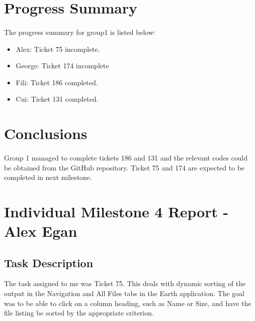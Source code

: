 \documentclass[10pt,a4,oneside]{article}
\begin{document}
\section{Progress Summary}

\paragraph{}
The progress summary for group1 is listed below:

\begin{itemize}
 \item Alex: Ticket 75 incomplete.
 \item George: Ticket 174 incomplete
 \item Fili: Ticket 186 completed.
 \item Cui: Ticket 131 completed.
\end{itemize}

\newpage

\section{Conclusions}

\paragraph{}
\noindent Group 1 managed to complete tickets 186 and 131 and the relevant codes could be obtained from the GitHub repository. Ticket 75 and 174 are expected to be completed in next milestone.

\newpage

\section{Individual Milestone 4 Report - Alex Egan}

\subsection*{Task Description}
The task assigned to me was Ticket 75. This deals with dynamic sorting of the output in the Navigation and All Files tabs in the Earth application. The goal was to be able to click on a column heading, such as Name or Size, and have the file listing be sorted by the appropriate criterion.
\end{document}
